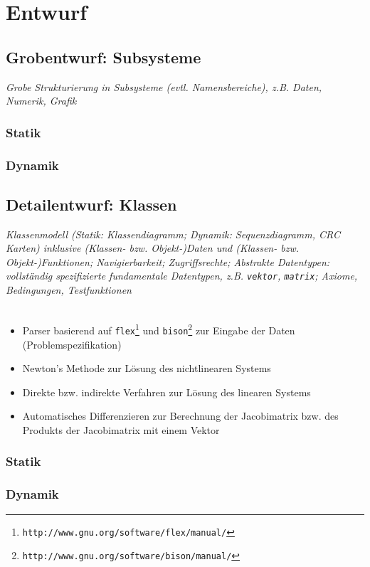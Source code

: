 \chapter{Entwurf}
\label{ch:3}

\section{Grobentwurf: Subsysteme}
\label{sec:3.1}

{\em Grobe Strukturierung in Subsysteme (evtl. Namensbereiche), z.B.
Daten, Numerik, Grafik} 

\subsection{Statik}

\subsection{Dynamik}

\section{Detailentwurf: Klassen}
\label{sec:3.2}

{\em Klassenmodell (Statik: Klassendiagramm; Dynamik: Sequenzdiagramm, 
CRC Karten) inklusive (Klassen- bzw. Objekt-)Daten und 
(Klassen- bzw. Objekt-)Funktionen; Navigierbarkeit; Zugriffsrechte;
Abstrakte Datentypen:
vollst\"andig spezifizierte fundamentale Datentypen, z.B. {\tt vektor}, 
{\tt matrix}; Axiome, Bedingungen, Testfunktionen}
\\
\\
\begin{itemize}
\item Parser basierend auf {\tt flex}\footnote{\tt http://www.gnu.org/software/flex/manual/} und
{\tt bison}\footnote{\tt http://www.gnu.org/software/bison/manual/}
\cite{Aho1986CPT,Muchnick1997ACD} zur Eingabe der Daten (Problemspezifikation)
\item Newton's Methode zur L\"osung des nichtlinearen Systems \cite{Kelley2003SNE}
\item Direkte \cite{Golub1989MC} bzw. indirekte Verfahren \cite{Saad1986Agm}
zur L\"osung des linearen Systems
\item Automatisches Differenzieren \cite{Griewank2000EDP,Wengert1964ASA} zur 
Berechnung der Jacobimatrix bzw. des Produkts der Jacobimatrix mit einem Vektor
\end{itemize}

\subsection{Statik}

\subsection{Dynamik}


